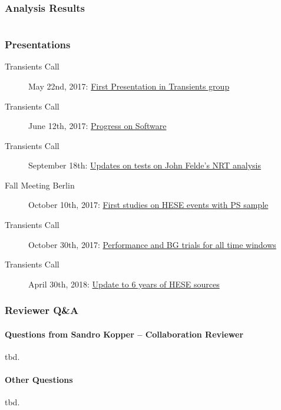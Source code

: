 \section{Analysis Results}



\appendix
\part*{\appendixname}
\section{Presentations}
\begin{description}
  \item[Transients Call] May 22nd, 2017: \href{https://drive.google.com/file/d/0B_Gkg-MCR-1za1RMbjlzTFE0YVU/view}{First Presentation in Transients group}
  \item[Transients Call] June 12th, 2017: \href{https://drive.google.com/file/d/0B_Gkg-MCR-1zTFI3Umg3XzZrSE0/view}{Progress on Software}
  \item[Transients Call] September 18th: \href{https://drive.google.com/file/d/0B_Gkg-MCR-1zR28tTmhBT3VYTGs/view}{Updates on tests on John Felde's NRT analysis}
  \item[Fall Meeting Berlin] October 10th, 2017: \href{https://events.icecube.wisc.edu/getFile.py/access?contribId=37&sessionId=32&resId=0&materialId=slides&confId=90}{First studies on HESE events with PS sample}
  \item[Transients Call] October 30th, 2017: \href{https://drive.google.com/file/d/0B_Gkg-MCR-1zOFdkajczT3JWNUU/view}{Performance and BG trials for all time windows}
  \item[Transients Call] April 30th, 2018: \href{https://drive.google.com/file/d/12vOMOpt1nMrmnBdM_4wV5sMdg0FUJLqF/view}{Update to 6 years of HESE sources}
\end{description}

\section*{Reviewer Q\&A}
\subsection*{Questions from Sandro Kopper -- Collaboration Reviewer}
tbd.

\subsection*{Other Questions}
tbd.

